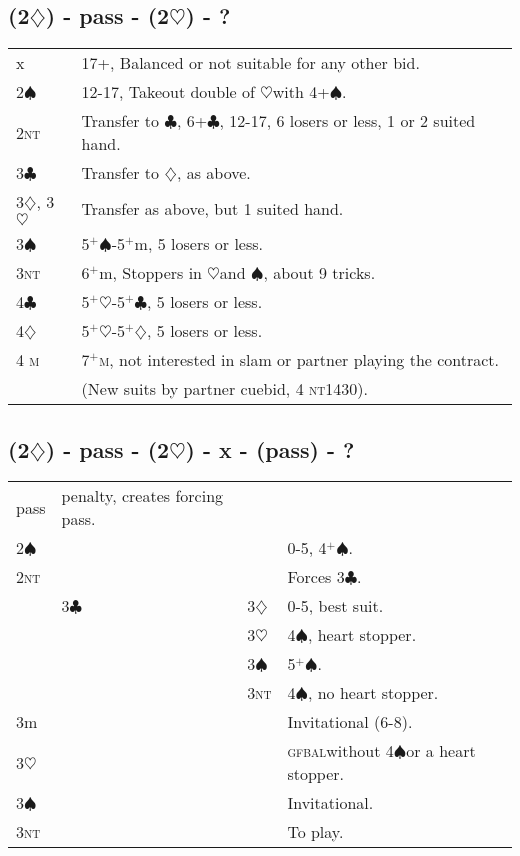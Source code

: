\documentclass{article}
\newcommand{\bal}{\textsc{bal}}
\newcommand{\gf}{\textsc{gf}}
\renewcommand{\c}{\ensuremath{\clubsuit}}
\renewcommand{\d}{\ensuremath{\diamondsuit}}
\newcommand{\h}{\ensuremath{\heartsuit}}
\newcommand{\s}{\ensuremath{\spadesuit}}
\newcommand{\nt}{\textsc{nt}}
\newcommand{\+}{\ensuremath{^+}}
\newcommand{\M}{\textsc{m}}
\begin{document}
\subsection{(2\d) - pass - (2\h) - ?}
\begin{tabular}{ll}
x  & 17+, Balanced or not suitable for any other bid. \\
2\s & 12-17, Takeout double of \h with 4+\s.\\
2\nt& Transfer to \c, 6+\c, 12-17, 6 losers or less, 1 or 2 suited hand. \\
3\c & Transfer to \d, as above.\\
3\d, 3\h & Transfer as above, but 1 suited hand.\\
3\s & 5\+\s-5\+m, 5 losers or less.\\
3\nt& 6\+m, Stoppers in \h and \s, about 9 tricks.\\
4\c & 5\+\h-5\+\c, 5 losers or less.\\
4\d & 5\+\h-5\+\d, 5 losers or less.\\
4 \M& 7\+\M, not interested in slam or partner playing the contract. \\
&(New suits by partner cuebid, 4 \nt 1430).\\
\end{tabular}

\subsection{(2\d) - pass - (2\h) - x - (pass) - ?}
\begin{tabular}{llll}
pass & penalty, creates forcing pass. \\
2\s &&& 0-5, 4\+\s.\\
2\nt &&& Forces 3\c. \\
& 3\c & 3\d & 0-5, best suit. \\
&& 3\h & 4\s, heart stopper. \\
&& 3\s & 5\+\s.\\
&& 3\nt & 4\s, no heart stopper.\\
3m &&& Invitational (6-8).\\
3\h &&& \gf \bal without 4\s or a heart stopper.\\
3\s &&& Invitational.\\
3\nt &&& To play.\\
\end{tabular}
\end{document}
